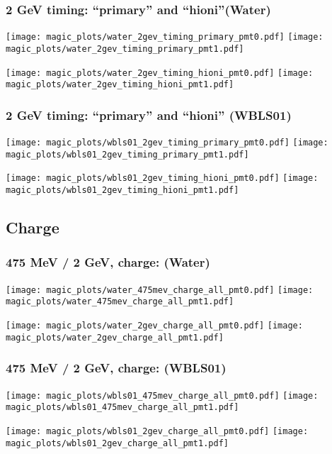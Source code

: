 \documentclass[xcolor=dvipsnames]{beamer}
\begin{document}
\begin{frame}[fragile]
  \frametitle{2 GeV timing:  ``primary'' and ``hioni''(Water)}

\texttt{[image: magic\_plots/water\_2gev\_timing\_primary\_pmt0.pdf]}%
\texttt{[image: magic\_plots/water\_2gev\_timing\_primary\_pmt1.pdf]}%

\texttt{[image: magic\_plots/water\_2gev\_timing\_hioni\_pmt0.pdf]}%
\texttt{[image: magic\_plots/water\_2gev\_timing\_hioni\_pmt1.pdf]}%
\end{frame}

\begin{frame}[fragile]
  \frametitle{2 GeV timing: ``primary'' and ``hioni'' (WBLS01)}

\texttt{[image: magic\_plots/wbls01\_2gev\_timing\_primary\_pmt0.pdf]}%
\texttt{[image: magic\_plots/wbls01\_2gev\_timing\_primary\_pmt1.pdf]}%

\texttt{[image: magic\_plots/wbls01\_2gev\_timing\_hioni\_pmt0.pdf]}%
\texttt{[image: magic\_plots/wbls01\_2gev\_timing\_hioni\_pmt1.pdf]}%
\end{frame}


\subsection{Charge}

\begin{frame}[fragile]
  \frametitle{475 MeV / 2 GeV, charge: (Water)}

\texttt{[image: magic\_plots/water\_475mev\_charge\_all\_pmt0.pdf]}%
\texttt{[image: magic\_plots/water\_475mev\_charge\_all\_pmt1.pdf]}%

\texttt{[image: magic\_plots/water\_2gev\_charge\_all\_pmt0.pdf]}%
\texttt{[image: magic\_plots/water\_2gev\_charge\_all\_pmt1.pdf]}%
\end{frame}

\begin{frame}[fragile]
  \frametitle{475 MeV / 2 GeV, charge: (WBLS01)}

\texttt{[image: magic\_plots/wbls01\_475mev\_charge\_all\_pmt0.pdf]}%
\texttt{[image: magic\_plots/wbls01\_475mev\_charge\_all\_pmt1.pdf]}%

\texttt{[image: magic\_plots/wbls01\_2gev\_charge\_all\_pmt0.pdf]}%
\texttt{[image: magic\_plots/wbls01\_2gev\_charge\_all\_pmt1.pdf]}%
\end{frame}
\end{document}
